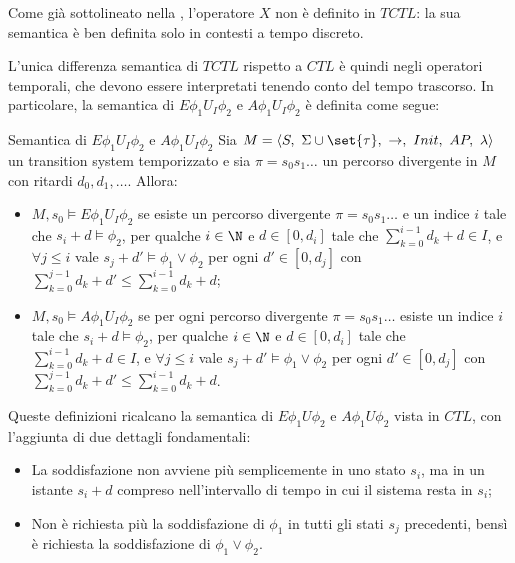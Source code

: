 \begin{warning}{}
  Come già sottolineato nella , l'operatore \(X\) non è definito in \(TCTL\): la sua semantica è ben definita solo in contesti a tempo discreto.
\end{warning}

L'unica differenza semantica di \(TCTL\) rispetto a \(CTL\) è quindi negli operatori temporali, che devono essere interpretati tenendo conto del tempo trascorso. In particolare, la semantica di \(E\phi_1 U_I \phi_2\) e \(A\phi_1 U_I \phi_2\) è definita come segue:
\begin{definition}{Semantica di \(E\phi_1 U_I \phi_2\) e \(A\phi_1 U_I \phi_2\)}
  Sia \(M = \langle S,\ \Sigma\cup\set{\tau},\ \to,\ Init,\ AP,\ \lambda\rangle\) un transition system temporizzato e sia \(\pi = s_0 s_1 \ldots\) un percorso divergente in \(M\) con ritardi \(d_0, d_1, \ldots\). Allora:
  \begin{itemize}
    \item \(M, s_0 \models E\phi_1 U_I \phi_2\) se esiste un percorso divergente \(\pi = s_0 s_1 \ldots\) e un indice \(i\) tale che \(s_i + d \models \phi_2\), per qualche \(i \in \N\) e \(d \in [0,d_i]\) tale che \(\sum_{k=0}^{i-1} d_k + d \in I\), e \(\forall j \leq i\) vale \(s_j + d' \models \phi_1\lor \phi_2\) per ogni \(d' \in [0,d_j]\) con \(\sum_{k=0}^{j-1} d_k + d' \leq \sum_{k=0}^{i-1} d_k + d\);
    \item \(M, s_0 \models A\phi_1 U_I \phi_2\) se per ogni percorso divergente \(\pi = s_0 s_1 \ldots\) esiste un indice \(i\) tale che \(s_i + d \models \phi_2\), per qualche \(i \in \N\) e \(d \in [0,d_i]\) tale che \(\sum_{k=0}^{i-1} d_k + d \in I\), e \(\forall j \leq i\) vale \(s_j + d' \models \phi_1\lor \phi_2\) per ogni \(d' \in [0,d_j]\) con \(\sum_{k=0}^{j-1} d_k + d' \leq \sum_{k=0}^{i-1} d_k + d\).
  \end{itemize}
\end{definition}

Queste definizioni ricalcano la semantica di \(E\phi_1 U \phi_2\) e \(A\phi_1 U \phi_2\) vista in \(CTL\), con l'aggiunta di due dettagli fondamentali:
\begin{itemize}
  \item La soddisfazione non avviene più semplicemente in uno stato \(s_i\), ma in un istante \(s_i + d\) compreso nell'intervallo di tempo in cui il sistema resta in \(s_i\);
  \item Non è richiesta più la soddisfazione di \(\phi_1\) in tutti gli stati \(s_j\) precedenti, bensì è richiesta la soddisfazione di \(\phi_1 \lor \phi_2\).
\end{itemize}

